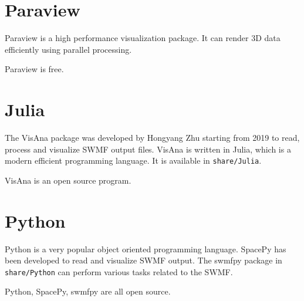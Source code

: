 \section{Paraview}

Paraview is a high performance visualization package.
It can render 3D data efficiently using parallel processing. 

Paraview is free.

\section{Julia}

The VisAna package was developed by Hongyang Zhu starting from 2019
to read, process and visualize SWMF output files. 
VisAna is written in Julia, which is a modern efficient programming
language. It is available in {\tt share/Julia}. 

VisAna is an open source program.

\section{Python}

Python is a very popular object oriented programming language. 
SpacePy has been developed to read and visualize SWMF output. 
The swmfpy package in {\tt share/Python} 
can perform various tasks related to the SWMF. 

Python, SpacePy, swmfpy are all open source.

